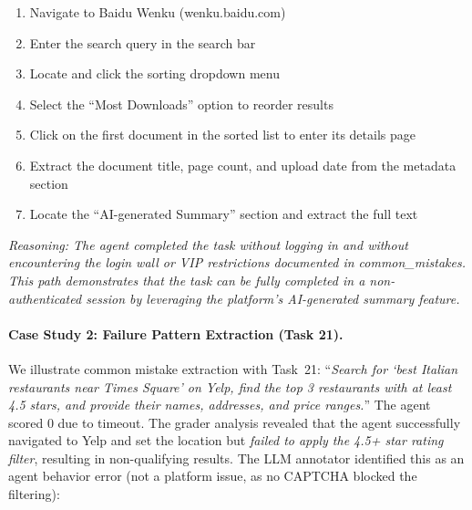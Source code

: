 \begin{tcolorbox}[
  colback=gray!5,
  colframe=gray!50,
  title={\textbf{Extracted \texttt{valid\_path}} for Task 22},
  fonttitle=\bfseries,
  breakable,
  enhanced,
  boxrule=1pt,
  arc=1.5mm
]
\small
\begin{enumerate}[leftmargin=*, itemsep=1pt]
    \item Navigate to Baidu Wenku (wenku.baidu.com)
    \item Enter the search query in the search bar
    \item Locate and click the sorting dropdown menu
    \item Select the ``Most Downloads'' option to reorder results
    \item Click on the first document in the sorted list to enter its details page
    \item Extract the document title, page count, and upload date from the metadata section
    \item Locate the ``AI-generated Summary'' section and extract the full text
\end{enumerate}
\vspace{2pt}
{\small\itshape Reasoning: The agent completed the task without logging in and without encountering the login wall or VIP restrictions documented in common\_mistakes. This path demonstrates that the task can be fully completed in a non-authenticated session by leveraging the platform's AI-generated summary feature.}
\end{tcolorbox}

\paragraph{Case Study 2: Failure Pattern Extraction (Task 21).}
We illustrate common mistake extraction with Task~21: ``\textit{Search for `best Italian restaurants near Times Square' on Yelp, find the top 3 restaurants with at least 4.5 stars, and provide their names, addresses, and price ranges.}'' The agent scored 0 due to timeout. The grader analysis revealed that the agent successfully navigated to Yelp and set the location but \emph{failed to apply the 4.5+ star rating filter}, resulting in non-qualifying results. The LLM annotator identified this as an agent behavior error (not a platform issue, as no CAPTCHA blocked the filtering):

